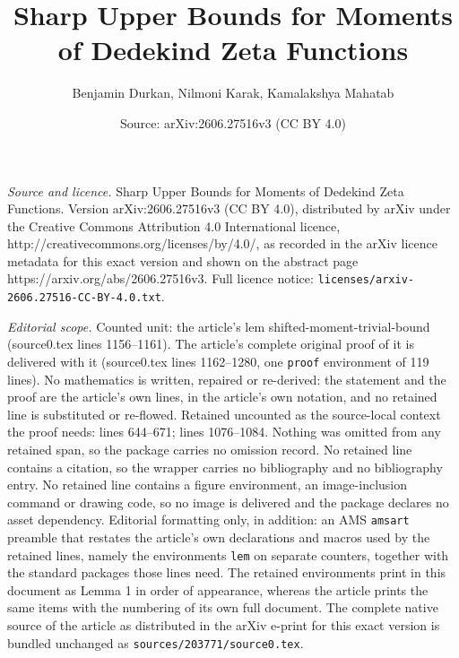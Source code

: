 \documentclass[10pt,a4paper]{amsart}
\title{Sharp Upper Bounds for Moments of Dedekind Zeta Functions}
\author{Benjamin Durkan, Nilmoni Karak, Kamalakshya Mahatab}
\date{Source: arXiv:2606.27516v3 (CC BY 4.0)}
\begin{document}
\maketitle

\noindent\emph{Source and licence.} Sharp Upper Bounds for Moments of Dedekind Zeta Functions. Version arXiv:2606.27516v3 (CC BY 4.0), distributed by arXiv under the Creative Commons Attribution 4.0 International licence, http://creativecommons.org/licenses/by/4.0/, as recorded in the arXiv licence metadata for this exact version and shown on the abstract page https://arxiv.org/abs/2606.27516v3. Full licence notice: \texttt{licenses/arxiv-2606.27516-CC-BY-4.0.txt}.\par\smallskip

\noindent\textit{Editorial scope.} Counted unit: the article's lem shifted-moment-trivial-bound (source0.tex lines 1156--1161). The article's complete original proof of it is delivered with it (source0.tex lines 1162--1280, one \texttt{proof} environment of 119 lines). No mathematics is written, repaired or re-derived: the statement and the proof are the article's own lines, in the article's own notation, and no retained line is substituted or re-flowed.  Retained uncounted as the source-local context the proof needs: lines 644--671; lines 1076--1084.  Nothing was omitted from any retained span, so the package carries no omission record.  No retained line contains a citation, so the wrapper carries no bibliography and no bibliography entry.  No retained line contains a figure environment, an image-inclusion command or drawing code, so no image is delivered and the package declares no asset dependency.  Editorial formatting only, in addition: an AMS \texttt{amsart} preamble that restates the article's own declarations and macros used by the retained lines, namely the environments \texttt{lem} on separate counters, together with the standard packages those lines need.  The retained environments print in this document as Lemma 1 in order of appearance, whereas the article prints the same items with the numbering of its own full document.  The complete native source of the article as distributed in the arXiv e-print for this exact version is bundled unchanged as \texttt{sources/203771/source0.tex}.
\end{document}
